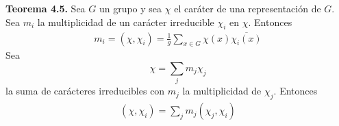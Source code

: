\documentclass[12pt]{book}
\theoremstyle{definition}
\newcounter{in}
\begin{document}
\textbf{Teorema 4.5. } Sea $G$ un grupo y sea $\chi$ el caráter de una representación de $G$. Sea $m_{i}$ la multiplicidad de un carácter irreducible $\chi_{i}$ en $\chi$. Entonces
\begin{equation*}
\begin{aligned}
m_{i} = (\chi,\chi_{i}) = \frac{1}{g} \sum_{x \in G} \chi(x) \overline{\chi_{i}(x)}
\end{aligned}
\end{equation*}
Sea $$\chi=\sum_{j} m_{j} \chi_{j}$$ la suma de carácteres irreducibles con $m_{j}$ la multiplicidad de $\chi_{j}$. Entonces
\begin{equation*}
\begin{aligned}
(\chi,\chi_{i}) = \sum_{j} m_{j} (\chi_{j},\chi_{i})
\end{aligned}
\end{equation*}

\backmatter




\printindex
\end{document}
